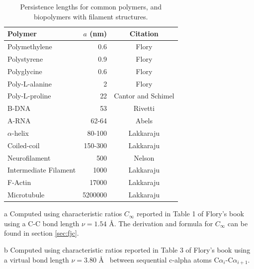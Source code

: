 \begin{table}[htbp]
\begin{center}
\begin{threeparttable}
\begin{tabular}{l|r|c}
\hline
Polymer               & $a$ (nm) & Citation  \\ \hline
Polymethylene         & 0.6      & Flory\tnote{a}      \\  
Polystyrene           & 0.9      & Flory\tnote{a}      \\
Polyglycine           & 0.6      & Flory \tnote{b}     \\
Poly-L-alanine        & 2        & Flory \tnote{b}     \\
Poly-L-proline        & 22       & Cantor and Schimel \cite{cantor1980} \\
B-DNA                 & 53       & Rivetti \cite{rivetti1996}     \\
A-RNA                 & 62-64    & Abels     \cite{abels2005}     \\
$\alpha$-helix        & 80-100   & Lakkaraju \cite{lakkaraju2009} \\
Coiled-coil           & 150-300  & Lakkaraju \cite{lakkaraju2009} \\
Neurofilament         & 500      & Nelson    \cite{nelson2004}    \\
Intermediate Filament & 1000     & Lakkaraju \cite{lakkaraju2009} \\
F-Actin               & 17000    & Lakkaraju \cite{lakkaraju2009} \\
Microtubule           & 5200000  & Lakkaraju \cite{lakkaraju2009} \\
\hline
\end{tabular}
\begin{tablenotes}
\item [a] Computed using  characteristic ratios $C_{\infty}$ reported in Table 1
  of Flory's book \cite{flory1969} using a C-C bond length $\nu = 1.54$
  \AA. The derivation and formula for $C_{\infty}$ can be found in section \ref{sec:fjc}.
\item [b] Computed using  characteristic ratios reported in Table 3
  of Flory's book \cite{flory1969} using a virtual bond length $\nu = 3.80$ \AA~
between sequential c-alpha atoms C${\alpha}_{i}$-C${\alpha}_{i+1}$.

\end{tablenotes}
\end{threeparttable}
\caption{Persistence lengths for common polymers, and biopolymers with
  filament structures.}
\label{tab:perval}
\end{center}
\end{table}

